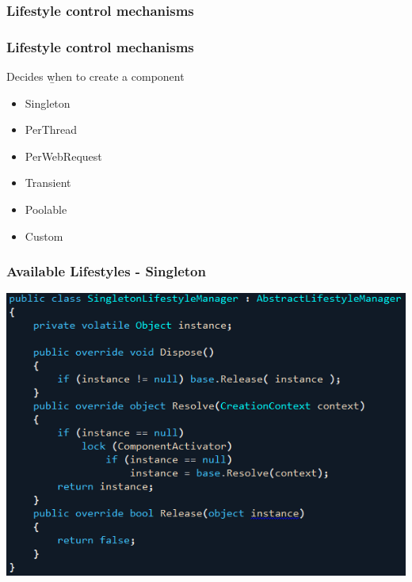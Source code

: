\documentclass[turkish]{beamer}
\begin{document}
		\subsubsection{Lifestyle control mechanisms}
			  \frame
				{
					\frametitle{Lifestyle control mechanisms}
					Decides \b{when} to create a component
			  	\begin{itemize}
			  	  \item<1->Singleton
			  	  \item<2->PerThread
			  	  \item<3->PerWebRequest
			  	  \item<4->Transient
			  	  \item<5->Poolable
			  	  \item<6->Custom
			  	\end{itemize}
			 }
			 \frame
			{
				\frametitle{Available Lifestyles - Singleton}
				\begin{center}
						\includegraphics[scale=0.50]{images/singletonlifestylemanager.png}
				\end{center}
	    }
\end{document}
